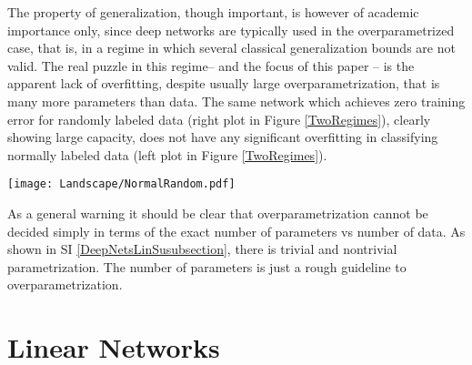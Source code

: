 \documentclass[10pt]{article}
\begin{document}
The property of generalization, though important, is however of
academic importance only, since deep networks are typically used in
the overparametrized case, that is, in a regime in which several
classical generalization bounds are not valid. The real puzzle in this regime-- and
the focus of this paper -- is the apparent lack of overfitting,
despite usually large overparametrization, that is many more
parameters than data. The same network which achieves zero training
error for randomly labeled data (right plot in Figure \ref{TwoRegimes}), clearly showing large capacity, does
not have any significant overfitting in classifying normally labeled
data (left plot in Figure \ref{TwoRegimes}). 
 

\begin{figure*}[h!]\centering
\texttt{[image: Landscape/NormalRandom.pdf]}
\caption{\it The figure (left) shows the behavior the classification
  error for a deep network
  with RELU activations trained on subsets of the CIFAR database by
  minimizing the crossentropy loss. The
  figure on the right shows the same network trained on subsets of the
  CIFAR database in which the labels have been randomly scrambled.
  The network is a 5-layer all convolutional network (i.e., no
  pooling) with 16 channels per hidden layer , resulting in only
  $W \approx 10000$ weights instead of the typical $300,000$. Neither
  data augmentation nor regularization is performed.}
\label{TwoRegimes}
\end{figure*}

As a general warning it should be clear that overparametrization
cannot be decided simply in terms of the exact number of parameters vs
number of data. As shown in SI \ref{DeepNetsLinSusubsection}, there is
trivial and nontrivial parametrization. The number of parameters is
just a rough guideline to overparametrization.

\section{Linear Networks}
\end{document}
